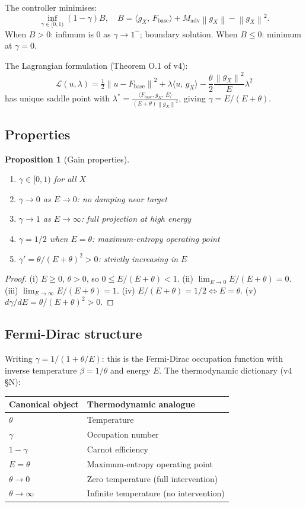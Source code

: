 \documentclass[11pt,a4paper]{article}
\newtheorem{proposition}[theorem]{Proposition}
\theoremstyle{definition}
\newcommand{\norm}[1]{\left\|#1\right\|}
\newcommand{\inner}[2]{\langle #1,\,#2\rangle}
\newcommand{\Fbase}{F_{\mathrm{base}}}
\newcommand{\gX}{g_X}
\newcommand{\half}{\tfrac{1}{2}}
\newcommand{\adv}{\mathrm{adv}}
\begin{document}
The controller minimises:
\[
\inf_{\gamma \in [0,1)} (1-\gamma) B, \quad B = \inner{\gX}{\Fbase} + M_\adv\norm{\gX} - \norm{\gX}^2.
\]
When $B > 0$: infimum is $0$ as $\gamma \to 1^-$; boundary solution.
When $B \leq 0$: minimum at $\gamma = 0$.

The Lagrangian formulation (Theorem O.1 of v4):
\[
\mathcal{L}(u,\lambda) = \half\norm{u - \Fbase}^2 + \lambda\inner{u}{\gX} - \frac{\theta}{2}\frac{\norm{\gX}^2}{E}\lambda^2
\]
has unique saddle point with $\lambda^* = \frac{\inner{\Fbase,\gX}E}{(E+\theta)\norm{\gX}^2}$,
giving $\gamma = E/(E+\theta)$.

\subsection{Properties}

\begin{proposition}[Gain properties]
\begin{enumerate}[label=(\roman*)]
\item $\gamma \in [0,1)$ for all $X$
\item $\gamma \to 0$ as $E \to 0$: no damping near target
\item $\gamma \to 1$ as $E \to \infty$: full projection at high energy
\item $\gamma = 1/2$ when $E = \theta$: maximum-entropy operating point
\item $\gamma' = \theta/(E+\theta)^2 > 0$: strictly increasing in $E$
\end{enumerate}
\end{proposition}

\begin{proof}
(i) $E \geq 0$, $\theta > 0$, so $0 \leq E/(E+\theta) < 1$.
(ii) $\lim_{E\to0} E/(E+\theta) = 0$.
(iii) $\lim_{E\to\infty} E/(E+\theta) = 1$.
(iv) $E/(E+\theta) = 1/2 \iff E = \theta$.
(v) $d\gamma/dE = \theta/(E+\theta)^2 > 0$.
\end{proof}

\subsection{Fermi-Dirac structure}

Writing $\gamma = 1/(1 + \theta/E)$: this is the Fermi-Dirac occupation function
with inverse temperature $\beta = 1/\theta$ and energy $E$.
The thermodynamic dictionary (v4 §N):
\begin{center}
\begin{tabular}{ll}
\toprule
Canonical object & Thermodynamic analogue \\
\midrule
$\theta$ & Temperature \\
$\gamma$ & Occupation number \\
$1-\gamma$ & Carnot efficiency \\
$E = \theta$ & Maximum-entropy operating point \\
$\theta \to 0$ & Zero temperature (full intervention) \\
$\theta \to \infty$ & Infinite temperature (no intervention) \\
\bottomrule
\end{tabular}
\end{center}
\end{document}
